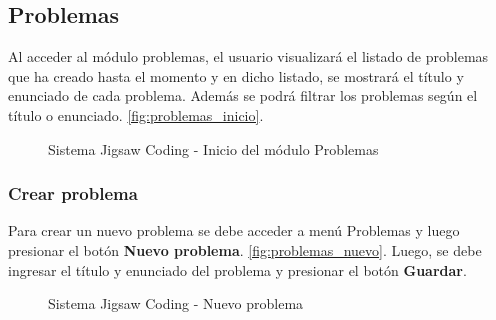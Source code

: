 \subsection{Problemas}
Al acceder al módulo problemas, el usuario visualizará el listado de problemas que ha creado hasta el momento y en dicho listado, se mostrará el título y enunciado de cada problema. Además se podrá filtrar los problemas según el título o enunciado. \autoref{fig:problemas_inicio}.

\begin{figure}[h!]
\centering
\caption[SJC Problemas]{Sistema Jigsaw Coding - Inicio del módulo Problemas}
\label{fig:problemas_inicio}
\end{figure}

\subsubsection{Crear problema}

Para crear un nuevo problema se debe acceder a menú Problemas y luego presionar el botón \textbf{Nuevo problema}. \autoref{fig:problemas_nuevo}. Luego, se debe ingresar el título y enunciado del problema y presionar el botón \textbf{Guardar}.

\begin{figure}
\centering
\caption[SJC Nuevo problema]{Sistema Jigsaw Coding - Nuevo problema}
\label{fig:problemas_nuevo}
\end{figure}

